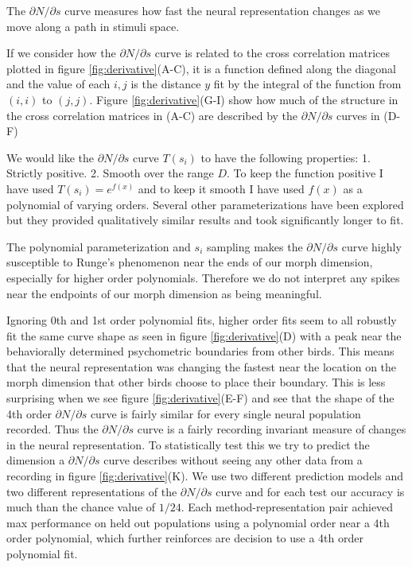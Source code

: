 The $\partial N / \partial s$ curve measures how fast the neural representation changes as we move along a path in stimuli space. 

If we consider how the $\partial N / \partial s$ curve is related to the cross correlation matrices plotted in figure \ref{fig:derivative}(A-C), it is a function defined along the diagonal and the value of each $i,j$ is the distance $y$ fit by the integral of the function from $(i,i)$ to $(j, j)$. Figure \ref{fig:derivative}(G-I) show how much of the structure in the cross correlation matrices in (A-C) are described by the $\partial N / \partial s$ curves in (D-F)

We would like the $\partial N / \partial s$ curve $T(s_i)$ to have the following properties: 1. Strictly positive. 2. Smooth over the range $D$.
To keep the function positive I have used $T(s_i)=e^{f(x)}$ and to keep it smooth I have used $f(x)$ as a polynomial of varying orders.
Several other parameterizations have been explored but they provided qualitatively similar results and took significantly longer to fit.

The polynomial parameterization and $s_i$ sampling makes the $\partial N / \partial s$ curve highly susceptible to Runge's phenomenon near the ends of our morph dimension, especially for higher order polynomials. Therefore we do not interpret any spikes near the endpoints of our morph dimension as being meaningful.

Ignoring 0th and 1st order polynomial fits, higher order fits seem to all robustly fit the same curve shape as seen in figure \ref{fig:derivative}(D) with a peak near the behaviorally determined psychometric boundaries from other birds. This means that the neural representation was changing the fastest near the location on the morph dimension that other birds choose to place their boundary. This is less surprising when we see figure \ref{fig:derivative}(E-F) and see that the shape of the 4th order $\partial N / \partial s$ curve is fairly similar for every single neural population recorded. Thus the $\partial N / \partial s$ curve is a fairly recording invariant measure of changes in the neural representation. To statistically test this we try to predict the dimension a $\partial N / \partial s$ curve describes without seeing any other data from a recording in figure \ref{fig:derivative}(K). We use two different prediction models and two different representations of the $\partial N / \partial s$ curve and for each test our accuracy is much than the chance value of $1/24$. Each method-representation pair achieved max performance on held out populations using a polynomial order near a 4th order polynomial, which further reinforces are decision to use a 4th order polynomial fit. 

